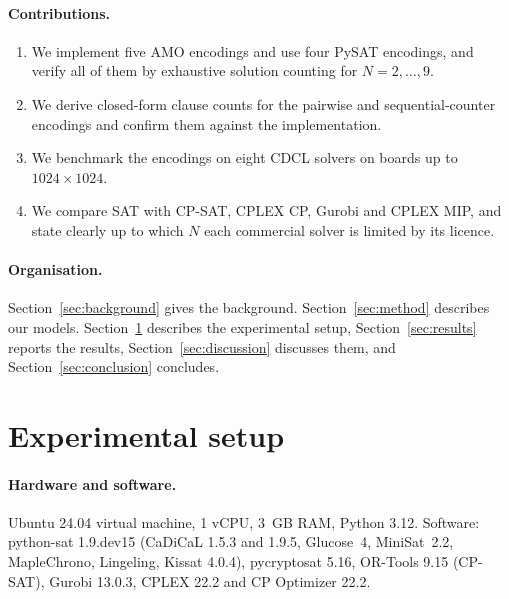 \documentclass[a4paper,fleqn]{cas-sc}
\begin{document}
\paragraph{Contributions.}
\begin{enumerate}
  \item We implement five AMO encodings and use four PySAT encodings, and verify all of them by exhaustive solution counting for $N=2,\dots,9$.
  \item We derive closed-form clause counts for the pairwise and sequential-counter encodings and confirm them against the implementation.
  \item We benchmark the encodings on eight CDCL solvers on boards up to $1024\times1024$.
  \item We compare SAT with CP-SAT, CPLEX CP, Gurobi and CPLEX MIP, and state clearly up to which $N$ each commercial solver is limited by its licence.
\end{enumerate}

\paragraph{Organisation.}
Section~\ref{sec:background} gives the background. Section~\ref{sec:method} describes our models. Section~\ref{sec:setup} describes the experimental setup, Section~\ref{sec:results} reports the results, Section~\ref{sec:discussion} discusses them, and Section~\ref{sec:conclusion} concludes.




\section{Experimental setup}\label{sec:setup}

\paragraph{Hardware and software.}
Ubuntu 24.04 virtual machine, 1 vCPU, 3~GB RAM, Python 3.12. Software: python-sat 1.9.dev15 (CaDiCaL 1.5.3 and 1.9.5, Glucose~4, MiniSat~2.2, MapleChrono, Lingeling, Kissat 4.0.4), pycryptosat 5.16, OR-Tools 9.15 (CP-SAT), Gurobi 13.0.3, CPLEX 22.2 and CP Optimizer 22.2.
\end{document}
